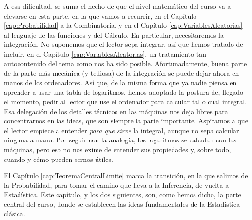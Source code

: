 A esa dificultad, se suma el hecho de que el nivel matemático del curso va a elevarse en esta
parte, en la que vamos a recurrir, en el Capítulo \ref{cap:Probabilidad} a la Combinatoria, y en el
Capítulo \ref{cap:VariablesAleatorias} al lenguaje de las funciones y del Cálculo. En particular,
necesitaremos la integración. No suponemos que el lector sepa integrar, así que hemos tratado de
incluir, en el Capítulo \ref{cap:VariablesAleatorias}, un tratamiento tan autocontenido del tema
como nos ha sido posible. Afortunadamente, buena parte de la parte más mecánica (y tediosa) de la
integración se puede dejar ahora en manos de los ordenadores. Así que, de la misma forma que ya
nadie piensa en aprender a usar una tabla de logaritmos, hemos adoptado la postura de, llegado el
momento, pedir al lector que use el ordenador para calcular tal o cual integral. Esa delegación de los detalles técnicos en las máquinas nos deja libres para concentrarnos en las ideas, que son siempre la parte importante. Aspiramos a que el lector empiece a entender {\em para que sirve} la integral, aunque no sepa calcular ninguna a mano. Por seguir con la analogía, los logaritmos se calculan con las máquinas, pero eso no nos exime de entender sus propiedades y, sobre todo, cuando y cómo pueden sernos útiles. 

El Capítulo \ref{cap:TeoremaCentralLimite} marca la transición, en la que salimos de la
Probabilidad, para tomar el camino que lleva a la Inferencia, de vuelta a Estadística. Este
capítulo, y los dos siguientes, son, como hemos dicho, la parte central del curso, donde se
establecen las ideas fundamentales de la Estadística clásica.
